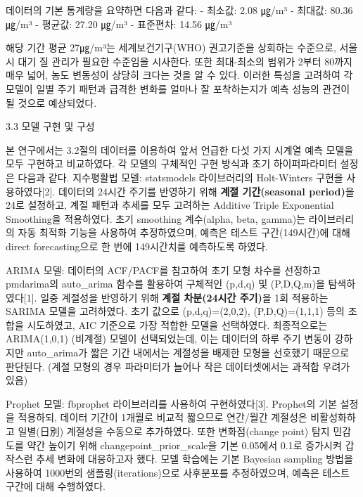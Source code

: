 \documentclass[12pt,ko,a4,]{report}
\begin{document}
데이터의 기본 통계량을 요약하면 다음과 같다: - 최소값: 2.08 ㎍/m³ -
최대값: 80.36 ㎍/m³ - 평균값: 27.20 ㎍/m³ - 표준편차: 14.56 ㎍/m³

해당 기간 평균 27㎍/m³는 세계보건기구(WHO) 권고기준을 상회하는 수준으로,
서울시 대기 질 관리가 필요한 수준임을 시사한다. 또한 최대-최소의 범위가
2부터 80까지 매우 넓어, 농도 변동성이 상당히 크다는 것을 알 수 있다.
이러한 특성을 고려하여 각 모델이 일별 주기 패턴과 급격한 변화를 얼마나
잘 포착하는지가 예측 성능의 관건이 될 것으로 예상되었다.

3.3 모델 구현 및 구성

본 연구에서는 3.2절의 데이터를 이용하여 앞서 언급한 다섯 가지 시계열
예측 모델을 모두 구현하고 비교하였다. 각 모델의 구체적인 구현 방식과
초기 하이퍼파라미터 설정은 다음과 같다. 지수평활법 모델: statsmodels
라이브러리의 Holt-Winters 구현을 사용하였다{[}2{]}. 데이터의 24시간
주기를 반영하기 위해 \textbf{계절 기간(seasonal period)}을 24로
설정하고, 계절 패턴과 추세를 모두 고려하는 Additive Triple Exponential
Smoothing을 적용하였다. 초기 smoothing 계수(alpha, beta, gamma)는
라이브러리의 자동 최적화 기능을 사용하여 추정하였으며, 예측은 테스트
구간(149시간)에 대해 direct forecasting으로 한 번에 149시간치를
예측하도록 하였다.

ARIMA 모델: 데이터의 ACF/PACF를 참고하여 초기 모형 차수를 선정하고
pmdarima의 auto\_arima 함수를 활용하여 구체적인 (p,d,q) 및 (P,D,Q,m)을
탐색하였다{[}1{]}. 일중 계절성을 반영하기 위해 \textbf{계절 차분(24시간
주기)}을 1회 적용하는 SARIMA 모델을 고려하였다. 초기 값으로
(p,d,q)=(2,0,2), (P,D,Q)=(1,1,1) 등의 조합을 시도하였고, AIC 기준으로
가장 적합한 모델을 선택하였다. 최종적으로는 ARIMA(1,0,1) (비계절) 모델이
선택되었는데, 이는 데이터의 하루 주기 변동이 강하지만 auto\_arima가 짧은
기간 내에서는 계절성을 배제한 모형을 선호했기 때문으로 판단된다. (계절
모형의 경우 파라미터가 늘어나 작은 데이터셋에서는 과적합 우려가 있음)

Prophet 모델: fbprophet 라이브러리를 사용하여 구현하였다{[}3{]}.
Prophet의 기본 설정을 적용하되, 데이터 기간이 1개월로 비교적 짧으므로
연간/월간 계절성은 비활성화하고 일별(日別) 계절성을 수동으로 추가하였다.
또한 변화점(change point) 탐지 민감도를 약간 높이기 위해
changepoint\_prior\_scale을 기본 0.05에서 0.1로 증가시켜 갑작스런 추세
변화에 대응하고자 했다. 모델 학습에는 기본 Bayesian sampling 방법을
사용하여 1000번의 샘플링(iterations)으로 사후분포를 추정하였으며, 예측은
테스트 구간에 대해 수행하였다.
\end{document}
